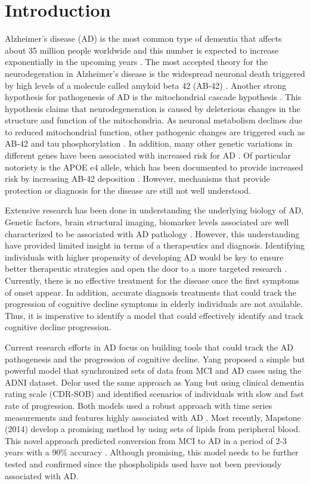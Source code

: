 \documentclass[10pt]{article}
\begin{document}
\section*{Introduction}
Alzheimer's disease (AD) is the most common type of dementia that affects about 35 million people worldwide and this number is expected to increase exponentially in the upcoming years \cite{prioritygeneva}. The most accepted theory for the neurodegeration in Alzheimer's disease is the widespread neuronal death triggered by high levels of a molecule called amyloid beta 42 (AB-42) \cite{reitz2011epidemiology,glenner1984alzheimers}. Another strong hypothesis for pathogenesis of AD is the mitochondrial cascade hypothesis \cite{rh2004mitochondrial}. This hypothesis claims that neurodegeneration is caused by deleterious changes in the structure and function of the mitochondria. As neuronal metabolism declines due to reduced mitochondrial function, other pathogenic changes are triggered such as AB-42 and tau phosphorylation \cite{pg2012}. In addition, many other genetic variations in different genes have been associated with increased risk for AD \cite{ac2010,jc2011}. Of particular notoriety is the APOE e4 allele, which has been documented to provide increased risk by increasing AB-42 deposition \cite{Mahley2009}. However, mechanisms that provide protection or diagnosis for the disease are still not well understood. 


Extensive research has been done in understanding the underlying biology of AD, Genetic factors, brain structural imaging, biomarker levels associated are well characterized to be associated with AD pathology \cite{hulstaert1999, klunk2004}. However, this understanding have provided limited insight in terms of a therapeutics and diagnosis. Identifying individuals with higher propensity of developing AD would be key to ensure better therapeutic strategies and open the door to a more targeted research \cite{swa2001,2003early}. Currently, there is no effective treatment for the disease once the first symptoms of onset appear. In addition, accurate diagnosis treatments that could track the progression of cognitive decline symptoms in elderly individuals are not available. Thus, it is imperative to identify a model that could effectively identify and track cognitive decline progression. 


Current research efforts in AD focus on building tools that could track the AD pathogenesis and the progression of cognitive decline. Yang \cite{Yang2011} proposed a simple but powerful model that synchronized sets of data from MCI and AD cases using the ADNI dataset. Delor \cite{delor2013} used the same approach as Yang but using clinical dementia rating scale (CDR-SOB) and identified scenarios of individuals with slow and fast rate of progression. Both models used a robust approach with time series measurements and features highly associated with AD \cite{Yang2011, delor2013}. Most recently, Mapstone (2014) develop a promising method by using sets of lipids from peripheral blood. This novel approach predicted conversion from MCI to AD in a period of 2-3 years with a 90\% accuracy \cite{map2014}. Although promising, this model needs to be further tested and confirmed since the phospholipids used have not been previously associated with AD. 
\end{document}
